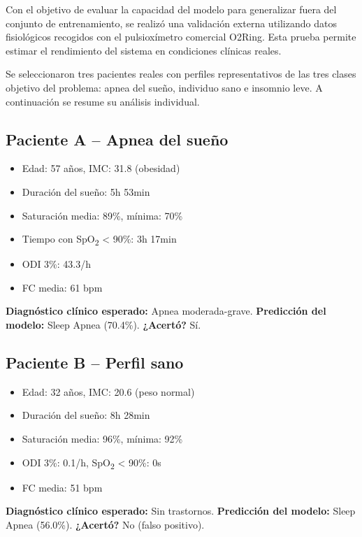 Con el objetivo de evaluar la capacidad del modelo para generalizar fuera del conjunto de entrenamiento, se realizó una validación externa utilizando datos fisiológicos recogidos con el pulsioxímetro comercial O2Ring. Esta prueba permite estimar el rendimiento del sistema en condiciones clínicas reales.

Se seleccionaron tres pacientes reales con perfiles representativos de las tres clases objetivo del problema: apnea del sueño, individuo sano e insomnio leve. A continuación se resume su análisis individual.


\subsection{Paciente A – Apnea del sueño}

\begin{itemize}
    \item Edad: 57 años, IMC: 31.8 (obesidad)
    \item Duración del sueño: 5h 53min
    \item Saturación media: 89\%, mínima: 70\%
    \item Tiempo con SpO\textsubscript{2} < 90\%: 3h 17min
    \item ODI 3\%: 43.3/h
    \item FC media: 61 bpm
\end{itemize}

\textbf{Diagnóstico clínico esperado:} Apnea moderada-grave.
\textbf{Predicción del modelo:} Sleep Apnea (70.4\%).  
\textbf{¿Acertó?} Sí.

\subsection{Paciente B – Perfil sano}

\begin{itemize}
    \item Edad: 32 años, IMC: 20.6 (peso normal)
    \item Duración del sueño: 8h 28min
    \item Saturación media: 96\%, mínima: 92\%
    \item ODI 3\%: 0.1/h, SpO\textsubscript{2} < 90\%: 0s
    \item FC media: 51 bpm
\end{itemize}

\textbf{Diagnóstico clínico esperado:} Sin trastornos.  
\textbf{Predicción del modelo:} Sleep Apnea (56.0\%).  
\textbf{¿Acertó?} No (falso positivo).


